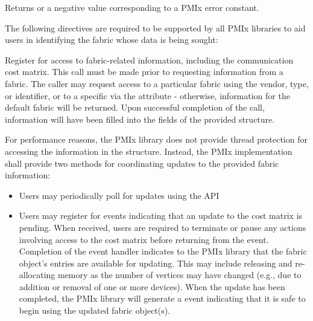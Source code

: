 Returns  or a negative value corresponding to a \ac{PMIx} error constant.

\reqattrstart
The following directives are required to be supported by all \ac{PMIx} libraries to aid users in identifying the fabric whose data is being sought:


\reqattrend

\descr

Register for access to fabric-related information, including the communication cost matrix. This call must be made prior to requesting information from a fabric. The caller may request access to a particular fabric using the vendor, type, or identifier, or to a specific  via the  attribute - otherwise, information for the default fabric will be returned. Upon successful completion of the call, information will have been filled into the fields of the provided  structure.

For performance reasons, the \ac{PMIx} library does not provide thread protection for accessing the information in the  structure. Instead, the \ac{PMIx} implementation shall provide two methods for coordinating updates to the provided fabric information:

\begin{itemize}

    \item Users may periodically poll for updates using the  \ac{API}

    \item Users may register for  events indicating that an update to the cost matrix is pending. When received, users are required to terminate or pause any actions involving access to the cost matrix before returning from the event. Completion of the  event handler indicates to the \ac{PMIx} library that the fabric object's entries are available for updating. This may include releasing and re-allocating memory as the number of vertices may have changed (e.g., due to addition or removal of one or more devices). When the update has been completed, the \ac{PMIx} library will generate a  event indicating that it is safe to begin using the updated fabric object(s).

\end{itemize}

